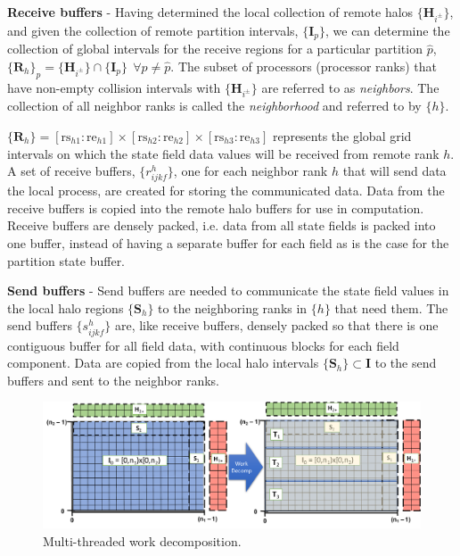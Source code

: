 \documentclass[11pt]{article}
\begin{document}
\textbf{Receive buffers} - Having determined the local collection of remote halos $\{\textbf{H}_{i^\pm}\}$, and given the collection of remote partition intervals, $\{\textbf{I}_p\}$, we can determine the collection of global intervals for the receive regions for a particular partition $\hat{p}$, $\{\textbf{R}_h\}_{\hat{p}} = \{\textbf{H}_{i^\pm}\}\cap\{\textbf{I}_p\}~~\forall p\neq \hat{p}$.  The subset of processors (processor ranks) that have non-empty collision intervals with $\{\textbf{H}_{i^\pm}\}$ are referred to as \textit{neighbors}. The collection of all neighbor ranks is called the \textit{neighborhood} and referred to by $\{h\}$. 

$\{\textbf{R}_h\} = [\text{rs}_{h1}:\text{re}_{h1}]\times[\text{rs}_{h2}:\text{re}_{h2}]\times[\text{rs}_{h3}:\text{re}_{h3}]$ represents the global grid intervals on which the state field data values will be received from remote rank $h$. A set of receive buffers, $\{r^h_{ijkf}\}$, one for each neighbor rank $h$ that will send data the local process, are created for storing the communicated data.  Data from the receive buffers is copied into the remote halo buffers for use in computation. Receive buffers are densely packed, i.e. data from all state fields is packed into one buffer, instead of having a separate buffer for each field as is the case for the partition state buffer. 


\textbf{Send buffers} - Send buffers are needed to communicate the state field values in the local halo regions $\{\textbf{S}_h\}$ to the neighboring ranks in $\{h\}$ that need them. The send buffers $\{s^h_{ijkf}\}$ are, like receive buffers, densely packed so that there is one contiguous buffer for all field data, with continuous blocks for each field component. Data are copied from the local halo intervals $\{\textbf{S}_h\} \subset \textbf{I}$ to the send buffers and sent to the neighbor ranks.


\begin{figure}[h]
\begin{center}
\includegraphics[width=\textwidth]{Figures/WorkDecomp}
\vspace{-20pt}
\caption{Multi-threaded work decomposition.}\label{fig:WorkDecomp}
\end{center}
\end{figure}
\end{document}
